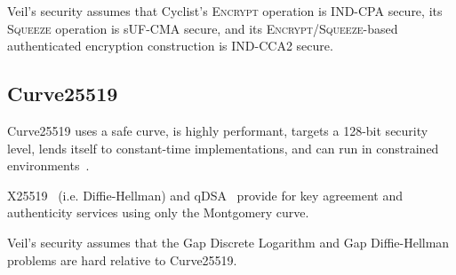 Veil's security assumes that Cyclist's \textsc{Encrypt} operation is IND-CPA secure, its
\textsc{Squeeze} operation is sUF-CMA secure, and its
\textsc{Encrypt}/\textsc{Squeeze}-based authenticated encryption construction is IND-CCA2 secure.

\subsection{Curve25519}\label{subsec:curve25519}

Curve25519 uses a safe curve, is highly performant, targets a 128-bit security level, lends itself to constant-time
implementations, and can run in constrained environments~\cite{bernstein2006}.

X25519~\cite{rfc7748} (i.e. Diffie-Hellman) and qDSA~\cite{renes2017} provide for key agreement and authenticity
services using only the Montgomery curve.

Veil's security assumes that the Gap Discrete Logarithm and Gap Diffie-Hellman problems are hard relative to
Curve25519.

